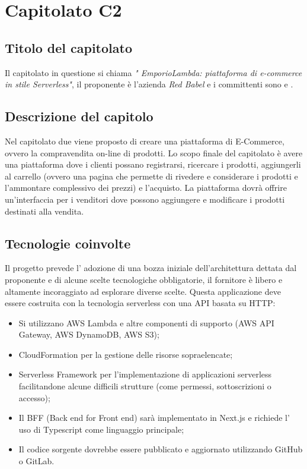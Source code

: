 \section{Capitolato C2}
\subsection{Titolo del capitolato}
Il capitolato in questione si chiama \textit{" 	EmporioLambda: piattaforma di e-commerce in stile Serverless"}, il proponente \`e l'azienda \textit{Red Babel} e i committenti sono \VT{} e \CR{}.

\subsection{Descrizione del capitolo}
Nel capitolato due viene proposto di creare una piattaforma di E-Commerce, ovvero la compravendita on-line di prodotti.
Lo scopo finale del capitolato è avere una piattaforma dove i clienti possano registrarsi, ricercare i prodotti, aggiungerli al carrello (ovvero una pagina che permette di rivedere e considerare i prodotti e l'ammontare complessivo dei prezzi) e l'acquisto. La piattaforma dovrà offrire un'interfaccia per i venditori dove possono aggiungere e modificare i prodotti destinati alla vendita.

\subsection{Tecnologie coinvolte}
Il progetto prevede l' adozione di una bozza iniziale dell'architettura dettata dal proponente e di alcune scelte tecnologiche obbligatorie, il fornitore è libero e altamente incoraggiato ad esplorare diverse scelte.
Questa applicazione deve essere costruita con la tecnologia serverless con una API basata su HTTP:
\begin{itemize}
\item	Si utilizzano AWS Lambda e altre componenti di supporto (AWS API Gateway, AWS DynamoDB, AWS S3);
\item	CloudFormation per la gestione delle risorse sopraelencate;
\item	Serverless Framework per l’implementazione di applicazioni serverless facilitandone alcune difficili strutture (come permessi, sottoscrizioni o accesso);
\item	Il BFF (Back end for Front end) sarà implementato in Next.js e richiede l' uso di Typescript come linguaggio principale;
\item	Il codice sorgente dovrebbe essere pubblicato e aggiornato utilizzando GitHub o GitLab.
\end{itemize}

